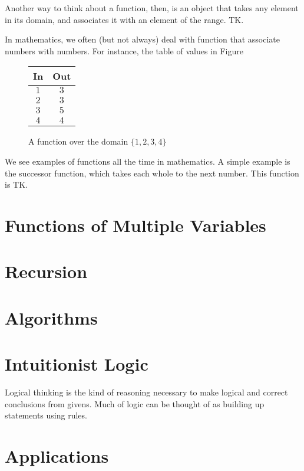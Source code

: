 \documentclass[a4paper,10pt]{report}
\begin{document}
Another way to think about a function, then, is an object that takes any
element in its domain, and associates it with an element of the range. TK.

In mathematics, we often (but not always) deal with function that associate
numbers with numbers. For instance, the table of values in Figure~

\begin{figure}
  \renewcommand{\arraystretch}{1.2}
  \begin{tabular}{|c|c|}
    \hline
    \textbf{In} & \textbf{Out} \\
    \hline
    \(1\) & \(3\) \\
    \(2\) & \(3\) \\
    \(3\) & \(5\) \\
    \(4\) & \(4\) \\
    \hline
  \end{tabular}

  \caption{A function over the domain \(\{1, 2, 3, 4\}\)}
\end{figure}

We see examples of functions all the time in mathematics. A simple example is
the successor function, which takes each whole to the next number. This
function is TK.

\chapter{Functions of Multiple Variables}

\chapter{Recursion}

\chapter{Algorithms}

\chapter{Intuitionist Logic}

Logical thinking is the kind of reasoning necessary to make logical and correct
conclusions from givens. Much of logic can be thought of as building up
statements using rules.

\chapter{Applications}


\printglossaries

\cleardoublepage
{}
\listoffigures
\end{document}
